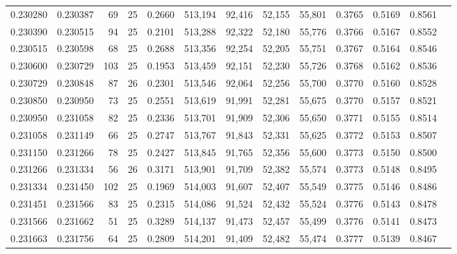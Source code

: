 \begin{tabular}{rrrrrrrrrrrrr}
0.230280 & 0.230387 &    69 &  25 &                                     0.2660 & 513,194 &  92,416 &  52,155 &  55,801 & 0.3765 & 0.5169 & 0.8561 \\
0.230390 & 0.230515 &    94 &  25 &                                     0.2101 & 513,288 &  92,322 &  52,180 &  55,776 & 0.3766 & 0.5167 & 0.8552 \\
0.230515 & 0.230598 &    68 &  25 &                                     0.2688 & 513,356 &  92,254 &  52,205 &  55,751 & 0.3767 & 0.5164 & 0.8546 \\
0.230600 & 0.230729 &   103 &  25 &                                     0.1953 & 513,459 &  92,151 &  52,230 &  55,726 & 0.3768 & 0.5162 & 0.8536 \\
0.230729 & 0.230848 &    87 &  26 &                                     0.2301 & 513,546 &  92,064 &  52,256 &  55,700 & 0.3770 & 0.5160 & 0.8528 \\
0.230850 & 0.230950 &    73 &  25 &                                     0.2551 & 513,619 &  91,991 &  52,281 &  55,675 & 0.3770 & 0.5157 & 0.8521 \\
0.230950 & 0.231058 &    82 &  25 &                                     0.2336 & 513,701 &  91,909 &  52,306 &  55,650 & 0.3771 & 0.5155 & 0.8514 \\
0.231058 & 0.231149 &    66 &  25 &                                     0.2747 & 513,767 &  91,843 &  52,331 &  55,625 & 0.3772 & 0.5153 & 0.8507 \\
0.231150 & 0.231266 &    78 &  25 &                                     0.2427 & 513,845 &  91,765 &  52,356 &  55,600 & 0.3773 & 0.5150 & 0.8500 \\
0.231266 & 0.231334 &    56 &  26 &                                     0.3171 & 513,901 &  91,709 &  52,382 &  55,574 & 0.3773 & 0.5148 & 0.8495 \\
0.231334 & 0.231450 &   102 &  25 &                                     0.1969 & 514,003 &  91,607 &  52,407 &  55,549 & 0.3775 & 0.5146 & 0.8486 \\
0.231451 & 0.231566 &    83 &  25 &                                     0.2315 & 514,086 &  91,524 &  52,432 &  55,524 & 0.3776 & 0.5143 & 0.8478 \\
0.231566 & 0.231662 &    51 &  25 &                                     0.3289 & 514,137 &  91,473 &  52,457 &  55,499 & 0.3776 & 0.5141 & 0.8473 \\
0.231663 & 0.231756 &    64 &  25 &                                     0.2809 & 514,201 &  91,409 &  52,482 &  55,474 & 0.3777 & 0.5139 & 0.8467 \\

\end{tabular}
